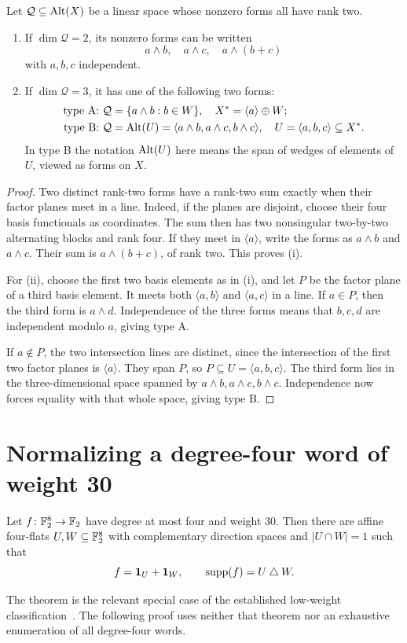 \begin{lemma}\label{lem:rank-two-pencil}
Let $\mathcal Q\subseteq\operatorname{Alt}(X)$ be a linear space whose nonzero forms all have rank two.
\begin{enumerate}[label=(\roman*)]
\item If $\dim\mathcal Q=2$, its nonzero forms can be written
\[
a\wedge b,\quad a\wedge c,\quad a\wedge(b+c)
\]
with $a,b,c$ independent.
\item If $\dim\mathcal Q=3$, it has one of the following two forms:
\begin{align*}
\text{type A: }&\mathcal Q=\{a\wedge b:b\in W\},
\quad X^*=\langle a\rangle\oplus W;\\
\text{type B: }&\mathcal Q=\operatorname{Alt}(U)=\langle a\wedge b,a\wedge c,b\wedge c\rangle,
\quad U=\langle a,b,c\rangle\subseteq X^*.
\end{align*}
In type B the notation $\operatorname{Alt}(U)$ here means the span of wedges of elements of $U$, viewed as forms on $X$.
\end{enumerate}
\end{lemma}
\begin{proof}
Two distinct rank-two forms have a rank-two sum exactly when their factor planes meet in a line. Indeed, if the planes are disjoint, choose their four basis functionals as coordinates. The sum then has two nonsingular two-by-two alternating blocks and rank four. If they meet in $\langle a\rangle$, write the forms as $a\wedge b$ and $a\wedge c$. Their sum is $a\wedge(b+c)$, of rank two. This proves (i).

For (ii), choose the first two basis elements as in (i), and let $P$ be the factor plane of a third basis element. It meets both $\langle a,b\rangle$ and $\langle a,c\rangle$ in a line. If $a\in P$, then the third form is $a\wedge d$. Independence of the three forms means that $b,c,d$ are independent modulo $a$, giving type A.

If $a\notin P$, the two intersection lines are distinct, since the intersection of the first two factor planes is $\langle a\rangle$. They span $P$, so $P\subseteq U=\langle a,b,c\rangle$. The third form lies in the three-dimensional space spanned by $a\wedge b,a\wedge c,b\wedge c$. Independence now forces equality with that whole space, giving type B.
\end{proof}

\section{Normalizing a degree-four word of weight 30}\label{sec:normalize}
\begin{theorem}\label{thm:weight-thirty}
Let $f\colon\mathbb F_2^8\to\mathbb F_2$ have degree at most four and weight $30$. Then there are affine four-flats $U,W\subseteq\mathbb F_2^8$ with complementary direction spaces and $|U\cap W|=1$ such that
\[
f=\mathbf 1_U+\mathbf 1_W,
\qquad \operatorname{supp}(f)=U\mathbin{\triangle} W.
\]
\end{theorem}
The theorem is the relevant special case of the established low-weight classification~\cite{KT,Ye}. The following proof uses neither that theorem nor an exhaustive enumeration of all degree-four words.

